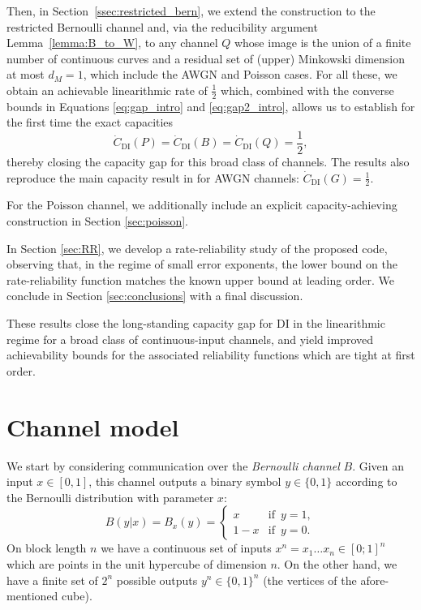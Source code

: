 \documentclass[10pt, conference]{IEEEtran}
\newcommand{\1}{\mathds{1}}
\begin{document}
Then, in Section~\ref{ssec:restricted_bern}, we extend the construction to the restricted Bernoulli channel and, via the reducibility argument Lemma~\ref{lemma:B_to_W}, to any channel $Q$ whose image is the union of a finite number of continuous curves and a residual set of (upper) Minkowski dimension at most $d_M=1$, which include the AWGN and Poisson cases. For all these, we obtain an achievable linearithmic rate of $\frac12$ which, combined with the converse bounds in Equations \eqref{eq:gap_intro} and \eqref{eq:gap2_intro}, allows us to establish for the first time the exact capacities
\begin{equation}
\dot C_{\text{DI}}(P)=\dot C_{\text{DI}}(B)=\dot C_{\text{DI}}(Q)=\frac12,
\end{equation}
thereby closing the capacity gap for this broad class of channels.
The results also reproduce the main capacity result in \cite{CDBW:Gauss} for AWGN channels: $\dot C_{\text{DI}}(G)=\frac12$.

For the Poisson channel, we additionally include an explicit capacity-achieving construction in Section \ref{sec:poisson}. 

In Section \ref{sec:RR}, we develop a rate-reliability study of the proposed code, observing that, in the regime of small error exponents, the lower bound on the rate-reliability function matches the known upper bound at leading order. We conclude in Section \ref{sec:conclusions} with a final discussion. 

These results close the long-standing capacity gap for DI in the linearithmic regime for a broad class of continuous-input channels, and yield improved achievability bounds for the associated reliability functions which are tight at first order.







\section{Channel model}\label{sec:channel_model}
We start by considering communication over the \emph{Bernoulli channel} $B$. Given an input $x\in[0,1]$, this channel outputs a binary symbol $y\in\{0,1\}$ according to the Bernoulli distribution with parameter $x$:
\begin{equation}\label{eq:BernoulliChannel}
B(y|x) = B_x(y) 
= \begin{cases}
    x   & \text{if }\, y=1, \\
    1-x & \text{if }\, y=0.
  \end{cases}
\end{equation}
On block length $n$ we have a continuous set of inputs $x^n = x_1\dots x_n \in[0;1]^n$ which are points in the unit hypercube of dimension $n$. On the other hand, we have a finite set of $2^n$ possible outputs $y^n\in\{0,1\}^n$ (the vertices of the afore-mentioned cube). 
\end{document}
